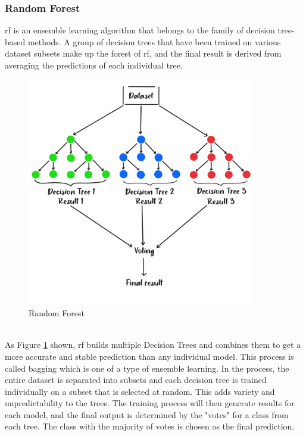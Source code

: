 \subsubsection{Random Forest}
\nocite{er_2021_random}
\nocite{scikitlearn_2018_sklearnensemblerandomforestclassifier}
\nocite{yiu_2019_understanding}
\gls{rf} is an ensemble learning algorithm that belongs to the family of decision tree-based methods.
A group of decision trees that have been trained on various dataset subsets make up the forest of \gls{rf}, and the final result is derived from averaging the predictions of each individual tree. \cite{ibm_2023_what}
\\
\begin{figure}[!ht]
    \centering
    \includegraphics[width=10cm]{Images/rf.png}
    \caption{Random Forest}
    \label{fig:rf}
\end{figure}
\\
\indent As Figure \ref{fig:rf} shown, \gls{rf} builds multiple Decision Trees and combines them to get a more accurate and stable prediction than any individual model.
This process is called bagging which is one of a type of ensemble learning. 
In the process, the entire dataset is separated into subsets and each decision tree is trained individually on a subset that is selected at random.
This adds variety and unpredictability to the trees.
The training process will then generate results for each model, and the final output is determined by the "votes" for a class from each tree.
The class with the majority of votes is chosen as the final prediction.
